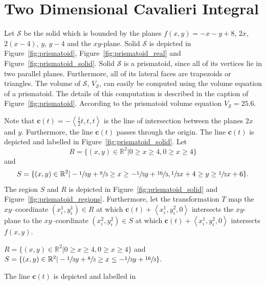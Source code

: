\documentclass{article}
\theoremstyle{theorem}
\theoremstyle{definition}
\begin{document}
\section{Two Dimensional Cavalieri Integral}
Let $\mathcal{S}$ be the solid which is bounded by the planes $f(x,y)=-x-y+8$, $2x$, $2(x-4)$, $y$, $y-4$ and the $xy$-plane. Solid $\mathcal{S}$ is depicted 
in Figure~\ref{fig:prismatoid}, Figure~\ref{fig:prismatoid_real} and Figure~\ref{fig:prismatoid_solid}. Solid $\mathcal{S}$ is a prismatoid, since all of its 
vertices lie in two parallel planes. Furthermore, all of its lateral faces are trapezoids or triangles. The volume of $\mathcal{S}$, $V_{\mathcal{S}}$, can easily be computed using the 
volume equation of a prismatoid. The details of this computation is described in the caption of Figure~\ref{fig:prismatoid}. According to the prismatoid volume 
equation $V_{\mathcal{S}}=25.6$.

Note that $\mathbf{c}(t) = -\left<\frac{1}{2}t,t,t\right>$ is the line of intersection between the planes $2x$ and $y$. Furthermore, the line 
$\mathbf{c}(t)$ passes through the origin. The line $\mathbf{c}(t)$ is depicted and labelled in Figure~\ref{fig:prismatoid_solid}. Let 
\begin{equation}
R = \{(x,y)\in\mathbb{R}^2|0 \geq x \geq 4, 0 \geq x \geq 4\} \nonumber
\end{equation}
and
\begin{equation}
S = \{(x,y)\in\mathbb{R}^2|-\sfrac{1}{3}y+\sfrac{8}{3}\geq x\geq -\sfrac{1}{3}y+\sfrac{16}{3}, \sfrac{1}{2} x + 4\geq y \geq \sfrac{1}{2} x + 6 \}. \nonumber
\end{equation}
The region $S$ and $R$ is depicted in Figure~\ref{fig:prismatoid_solid} and Figure~\ref{fig:prismatoid_regions}. Furthermore, let the transformation $T$ map the $xy$--coordinate $(x_i^1,y_i^1)\in R$ at which $\mathbf{c}(t) + \left <x_i^1,y_i^2,0 \right >$ intersects the 
$xy$-plane to the $xy$--coordinate $(x_i^2,y_i^2)\in S$ at which $\mathbf{c}(t) + \left <x_i^1,y_i^2,0 \right >$ intersects $f(x,y)$. 




$R = \{(x,y)\in\mathbb{R}^2|0 \geq x \geq 4, 0 \geq x \geq 4\}$
and $S = \{(x,y)\in\mathbb{R}^2|-\sfrac{1}{3}y+\sfrac{8}{3}\geq x\leq -\sfrac{1}{3}y+\sfrac{16}{3} \}$.



The line $\mathbf{c}(t)$  is depicted and labelled in 
\end{document}
